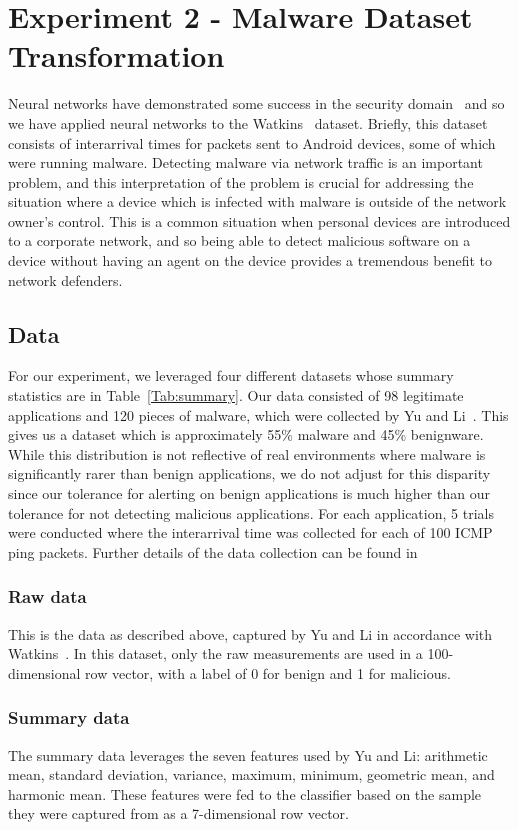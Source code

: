 \chapter{Experiment 2 - Malware Dataset Transformation}
\label{chap:three}
Neural networks have demonstrated some success in the security domain~\cite{raff2018malware} and so we have applied neural networks to the Watkins~\cite{watkins2013using} dataset.
Briefly, this dataset consists of interarrival times for packets sent to Android devices, some of which were running malware.
Detecting malware via network traffic is an important problem, and this interpretation of the problem is crucial for addressing the situation where a device which is infected with malware is outside of the network owner's control.
This is a common situation when personal devices are introduced to a corporate network, and so being able to detect malicious software on a device without having an agent on the device provides a tremendous benefit to network defenders.

\section{Data}
For our experiment, we leveraged four different datasets whose summary statistics are in Table~\ref{Tab:summary}. 
Our data consisted of 98 legitimate applications and 120 pieces of malware, which were collected by Yu and Li~\cite{yu2018network}.
This gives us a dataset which is approximately 55\% malware and 45\% benignware.
While this distribution is not reflective of real environments where malware is significantly rarer than benign applications, we do not adjust for this disparity since our tolerance for alerting on benign applications is much higher than our tolerance for not detecting malicious applications. 
For each application, 5 trials were conducted where the interarrival time was collected for each of 100 ICMP ping packets.
Further details of the data collection can be found in \cite{yu2018network, watkins2013using}

\subsection{Raw data}
This is the data as described above, captured by Yu and Li in accordance with Watkins~\cite{watkins2013using}.
In this dataset, only the raw measurements are used in a 100-dimensional row vector, with a label of 0 for benign and 1 for malicious.

\subsection{Summary data}
The summary data leverages the seven features used by Yu and Li: arithmetic mean, standard deviation, variance, maximum, minimum, geometric mean, and harmonic mean. 
These features were fed to the classifier based on the sample they were captured from as a 7-dimensional row vector.

